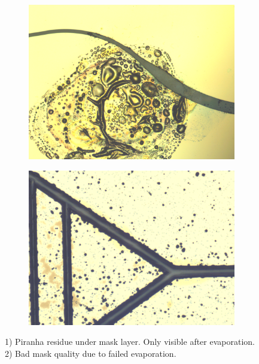 \documentclass[final]{jyflluk}
\begin{document}
\begin{figure}[h]
    \centering
    \begin{subfigure}[ht]{0.48\textwidth}
        \centering
        \includegraphics[width=\linewidth]{optical/bad_piranha.png} 
        \caption{} \label{fig:piranjaaa}
    \end{subfigure}
    \hfill
    \begin{subfigure}[ht]{0.48\textwidth}
        \centering
        \includegraphics[width=\linewidth]{optical/faultyevap.png} 
        \caption{} \label{fig:faultyy}
    \end{subfigure}
    \caption{1) Piranha residue under mask layer. Only visible after evaporation. 2) Bad mask quality due to failed evaporation.} \label{fig:bad_piranha}
\end{figure}  
\end{document}

